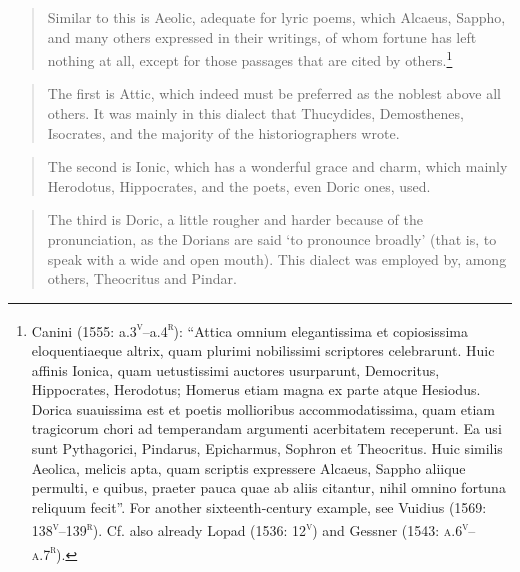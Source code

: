 \documentclass[output=paper]{langsci/langscibook}
\begin{document}
\begin{quote}
Similar to this is Aeolic, adequate for lyric poems, which Alcaeus, Sappho, and many others expressed in their writings, of whom fortune has left nothing at all, except for those passages that are cited by others.\footnote{Canini (1555: a.3\textsc{\textsuperscript{v}}–a.4\textsc{\textsuperscript{r}}): “Attica omnium elegantissima et copiosissima eloquentiaeque altrix, quam plurimi nobilissimi scriptores celebrarunt. Huic affinis Ionica, quam uetustissimi auctores usurparunt, Democritus, Hippocrates, Herodotus; Homerus etiam magna ex parte atque Hesiodus. Dorica suauissima est et poetis mollioribus accommodatissima, quam etiam tragicorum chori ad temperandam argumenti acerbitatem receperunt. Ea usi sunt Pythagorici, Pindarus, Epicharmus, Sophron et Theocritus. Huic similis Aeolica, melicis apta, quam scriptis expressere Alcaeus, Sappho aliique permulti, e quibus, praeter pauca quae ab aliis citantur, nihil omnino fortuna reliquum fecit”. For another sixteenth-century example, see Vuidius (1569: 138\textsc{\textsuperscript{v}}–139\textsc{\textsuperscript{r}}). Cf. also already Lopad (1536: 12\textsc{\textsuperscript{v}}) and Gessner (1543: \textsc{a.6}\textsc{\textsuperscript{v}}\textsc{–a.7}\textsc{\textsuperscript{r}}).}
\end{quote}

\begin{quote}
The first is Attic, which indeed must be preferred as the noblest above all others. It was mainly in this dialect that Thucydides, Demosthenes, Isocrates, and the majority of the historiographers wrote.
\end{quote}

\begin{quote}
The second is Ionic, which has a wonderful grace and charm, which mainly Herodotus, Hippocrates, and the poets, even Doric ones, used.
\end{quote}

\begin{quote}
The third is Doric, a little rougher and harder because of the pronunciation, as the Dorians are said ‘to pronounce broadly’ (that is, to speak with a wide and open mouth). This dialect was employed by, among others, Theocritus and Pindar.
\end{quote}
\end{document}
